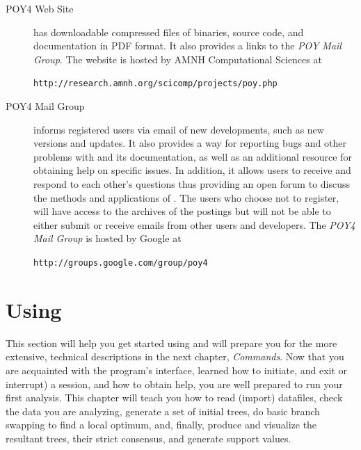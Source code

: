 \begin{description}
\item[POY4 Web Site] has downloadable compressed files of \poy binaries, source code, and documentation in PDF format. It also provides a links to the \emph{POY Mail Group}. The website is hosted by AMNH Computational Sciences at 
\begin{center}
\texttt{http://research.amnh.org/scicomp/projects/poy.php}
\end{center}
\item[POY4 Mail Group] informs registered users via email of new developments, such as new versions and updates. It also provides a way for reporting bugs and other problems with \poy and its documentation, as well as an additional resource for obtaining help on specific issues. In addition, it allows users to receive and respond to each other's questions thus providing an open forum to  discuss the methods and applications of \poy. The users who choose not to register, will have access to the archives of the postings but will not be able to either submit or receive emails from other users and \poy developers. The \emph{POY4 Mail Group} is hosted  by Google at
	\begin{center}
	\texttt{http://groups.google.com/group/poy4}
	\end{center}
	
\end{description}

\section{Using \poy}

This section will help you get started using \poy and will prepare you for the
more extensive, technical descriptions in the next chapter, \emph{\poy Commands}. Now that you are acquainted with the program's interface, learned how to initiate, and exit or interrupt) a \poy session, and how to obtain help, you are well prepared to run your first analysis. This chapter will teach
you how to read (import) datafiles, check the data you are analyzing, generate
a set of initial trees, do basic branch swapping to find a local optimum, and, finally, produce
and visualize the resultant trees, their strict consensus, and generate support values.


